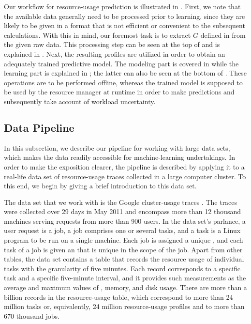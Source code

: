 Our workflow for resource-usage prediction is illustrated in
. First, we note that the available data generally need to
be processed prior to learning, since they are likely to be given in a format
that is not efficient or convenient to the subsequent calculations. With this in
mind, our foremost task is to extract $G$ defined in  from
the given raw data. This processing step can be seen at the top of
 and is explained in . Next, the
resulting profiles are utilized in order to obtain an adequately trained
predictive model. The modeling part is covered in 
while the learning part is explained in ; the
latter can also be seen at the bottom of . These operations
are to be performed offline, whereas the trained model is supposed to be used by
the resource manager at runtime in order to make predictions and subsequently
take account of workload uncertainty.

\subsection{Data Pipeline}

In this subsection, we describe our pipeline for working with large data sets,
which makes the data readily accessible for machine-learning undertakings. In
order to make the exposition clearer, the pipeline is described by applying it
to a real-life data set of resource-usage traces collected in a large computer
cluster. To this end, we begin by giving a brief introduction to this data set.

The data set that we work with is the Google cluster-usage traces
\cite{reiss2011}. The traces were collected over 29 days in May 2011 and
encompass more than 12 thousand machines serving requests from more than 900
users. In the data set's parlance, a user request is a job, a job comprises one
or several tasks, and a task is a Linux program to be run on a single machine.
Each job is assigned a unique , and each task of a job is given an
 that is unique in the scope of the job. Apart from other tables, the
data set contains a table that records the resource usage of individual tasks
with the granularity of five minutes. Each record corresponds to a specific task
and a specific five-minute interval, and it provides such measurements as the
average and maximum values of , memory, and disk usage. There are more
than a billion records in the resource-usage table, which correspond to more
than 24 million tasks or, equivalently, 24 million resource-usage profiles and
to more than 670 thousand jobs.

